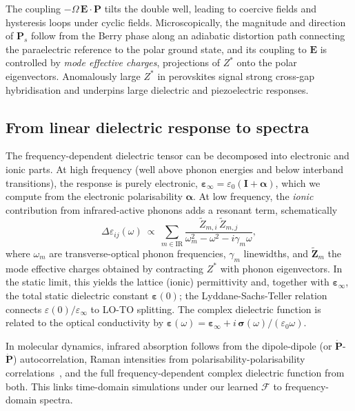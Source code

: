 \documentclass[aps,physrev,graphicx,amsmath,amssymb,
               reprint,superscriptaddress]{revtex4-2}
\begin{document}
The coupling $-\Omega\,\mathbf E\!\cdot\!\mathbf P$ tilts the double well, leading to coercive fields and hysteresis loops under cyclic fields.
Microscopically, the magnitude and direction of $\mathbf P_s$ follow from the Berry phase along an adiabatic distortion path connecting the paraelectric reference to the polar ground state, and its coupling to $\mathbf E$ is controlled by \emph{mode effective charges}, projections of $Z^*$ onto the polar eigenvectors.
Anomalously large $Z^*$ in perovskites signal strong cross-gap hybridisation and underpins large dielectric and piezoelectric responses.

\subsection{From linear dielectric response to spectra}
The frequency-dependent dielectric tensor can be decomposed into electronic and ionic parts. At high frequency (well above phonon energies and below interband transitions), the response is purely electronic, $\boldsymbol\varepsilon_\infty=\varepsilon_0(\mathbf I+\boldsymbol\alpha)$, which we compute from the electronic polarisability $\boldsymbol\alpha$. At low frequency, the \emph{ionic} contribution from infrared-active phonons adds a resonant term, schematically
\begin{equation}
\Delta\varepsilon_{ij}(\omega)\ \propto\
\sum_{m\in\text{IR}} \frac{\tilde Z_{m,i}\,\tilde Z_{m,j}}{\omega_{m}^2-\omega^2-i\gamma_m\omega},
\label{eq:ionic_eps}
\end{equation}
where $\omega_m$ are transverse-optical phonon frequencies, $\gamma_m$ linewidths, and $\tilde{\mathbf Z}_m$ the mode effective charges obtained by contracting $Z^*$ with phonon eigenvectors. In the static limit, this yields the lattice (ionic) permittivity and, together with $\boldsymbol\varepsilon_\infty$, the total static dielectric constant $\boldsymbol\varepsilon(0)$; the Lyddane-Sachs-Teller relation connects $\varepsilon(0)/\varepsilon_\infty$ to LO-TO splitting. The complex dielectric function is related to the optical conductivity by $\boldsymbol\varepsilon(\omega)=\boldsymbol\varepsilon_\infty + i\,\boldsymbol\sigma(\omega)/(\varepsilon_0\omega)$.

In molecular dynamics, infrared absorption follows from the dipole-dipole (or $\dot{\mathbf P}$-$\dot{\mathbf P}$) autocorrelation, Raman intensities from polarisability-polarisability correlations~\cite{Thomas2013, Luber2014}, and the full frequency-dependent complex dielectric function from both. This links time-domain simulations under our learned $\mathcal F$ to frequency-domain spectra.
\end{document}
